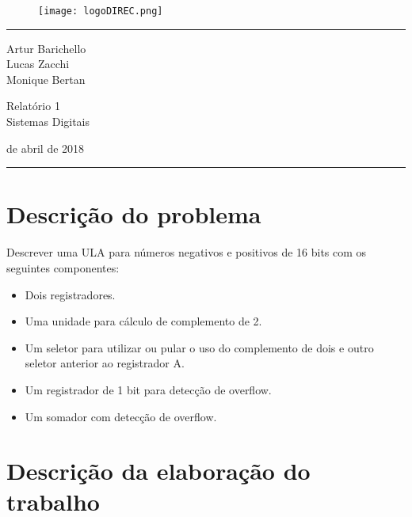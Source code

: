 \documentclass[a4paper]{article}
\begin{document}

\begin{figure}[h!]
\centering
\texttt{[image: logoDIREC.png]}
\end{figure}

\fancyhead[C]{}
\hrule \medskip %
\begin{minipage}{0.295\textwidth}
\raggedright
\footnotesize

Artur Barichello \hfill\\
Lucas Zacchi \hfill\\
Monique Bertan \hfill\\

\end{minipage}
\begin{minipage}{0.4\textwidth}
\centering
\large
Relatório 1\\
\normalsize
Sistemas Digitais\\
\end{minipage}
\begin{minipage}{0.295\textwidth}
 de abril de 2018\hfill\\
\end{minipage}
\medskip\hrule
\bigskip

\section{\textbf{Descrição do problema}}

Descrever uma ULA para números negativos e positivos de 16 bits com os seguintes componentes:
\begin{itemize}
\item Dois registradores.
\item Uma unidade para cálculo de complemento de 2.
\item Um seletor para utilizar ou pular o uso do complemento de dois e outro seletor anterior ao registrador A.
\item Um registrador de 1 bit para detecção de overflow.
\item Um somador com detecção de overflow.
\end{itemize}

\section{\textbf{Descrição da elaboração do trabalho}}
\end{document}
